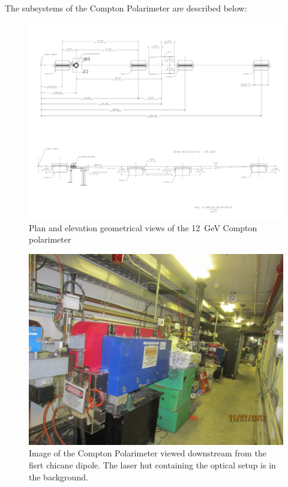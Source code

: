 The subsystems of the Compton Polarimeter  are described below:

 \begin{figure}[htp]
    \begin{center}
        \includegraphics*[angle=90,width=\textwidth]{compton_geometry}
    \end{center}
    \caption[compton:Geometry  layout]{
            Plan and elevation geometrical views of the 12~GeV Compton polarimeter
            }
    \label{fig:compton_geometry}
 \end{figure}

 \begin{figure}[htp]
    \begin{center}
        \includegraphics*[angle=90,width=\textwidth]{compton_pic_1}
    \end{center}
    \caption[compton:compton  pic]{
            Image of the Compton Polarimeter viewed downstream  from the fisrt chicane dipole. The laser hut containing the optical setup is in the  background.}
    \label{fig:compton_pic}
 \end{figure}

